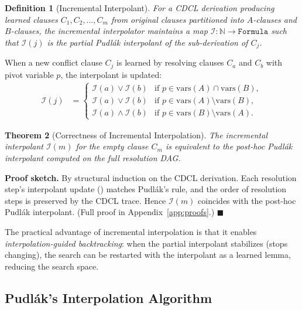 \documentclass[conference]{IEEEtran}
\newtheorem{theorem}{Theorem}[section]
\newtheorem{definition}[theorem]{Definition}
\newenvironment{proof}[1][Proof]{\textbf{#1.} }{\hfill$\blacksquare$}
\begin{document}
\begin{definition}[Incremental Interpolant]
  \label{def:incr-interpolant}
  For a CDCL derivation producing learned clauses
  $C_1, C_2, \dots, C_m$ from original clauses partitioned into
  $A$-clauses and $B$-clauses, the incremental interpolator maintains
  a map $\mathcal{I} : \mathbb{N} \to \mathtt{Formula}$ such that
  $\mathcal{I}(j)$ is the partial Pudl\'{a}k interpolant of the
  sub-derivation of $C_j$.
\end{definition}

When a new conflict clause $C_j$ is learned by resolving clauses
$C_a$ and $C_b$ with pivot variable $p$, the interpolant is updated:
\begin{align}
  \mathcal{I}(j) &=
  \begin{cases}
    \mathcal{I}(a) \lor \mathcal{I}(b) & \text{if } p \in \mathrm{vars}(A) \cap \mathrm{vars}(B), \\
    \mathcal{I}(a) \lor \mathcal{I}(b) & \text{if } p \in \mathrm{vars}(A) \setminus \mathrm{vars}(B), \\
    \mathcal{I}(a) \land \mathcal{I}(b) & \text{if } p \in \mathrm{vars}(B) \setminus \mathrm{vars}(A).
  \end{cases}
  \label{eq:incr-interpolation}
\end{align}

\begin{theorem}[Correctness of Incremental Interpolation]
  \label{thm:incr-correct}
  The incremental interpolant $\mathcal{I}(m)$ for the empty clause
  $C_m$ is equivalent to the post-hoc Pudl\'{a}k interpolant computed
  on the full resolution DAG.
\end{theorem}
\begin{proof}[Proof sketch]
  By structural induction on the CDCL derivation.  Each resolution
  step's interpolant update () matches
  Pudl\'{a}k's rule, and the order of resolution steps is preserved
  by the CDCL trace.  Hence $\mathcal{I}(m)$ coincides with the post-hoc
  Pudl\'{a}k interpolant.
  (Full proof in Appendix~\ref{app:proofs}.)
\end{proof}

The practical advantage of incremental interpolation is that it
enables \emph{interpolation-guided backtracking}: when the partial
interpolant stabilizes (stops changing), the search can be restarted
with the interpolant as a learned lemma, reducing the search space.

\subsection{Pudl\'{a}k's Interpolation Algorithm}
\label{sec:pudlak}
\end{document}
